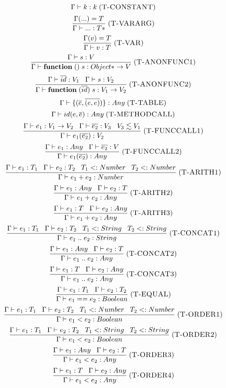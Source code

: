 \documentclass[12pt]{article}
\newcommand{\mylabel}[1]{\; (\textsc{#1})}
\newcommand{\subtype}{<:}
\newcommand{\env}{\Gamma}
\begin{document}
\[
\env \vdash k : k
\mylabel{T-CONSTANT}
\]
\[
\frac{\env({...}) = T}
     {\env \vdash {...} : T*}
\mylabel{T-VARARG}
\]
\[
\frac{\env(v) = T}
     {\env \vdash v : T}
\mylabel{T-VAR}
\]
\[
\frac{\env \vdash s:V}
     {\env \vdash \mathbf{function} \; () \; s : {Object*} \rightarrow V}
\mylabel{T-ANONFUNC1}
\]
\[
\frac{\env \vdash \overline{id}:V_{1} \;\;\; \env \vdash s:V_{2}}
     {\env \vdash \mathbf{function} \; (\overline{id}) \; s :
     {V_{1}} \rightarrow V_{2}}
\mylabel{T-ANONFUNC2}
\]
\[
\env \vdash \{(\overline{e},\overline{(e,e)})\} : Any
\mylabel{T-TABLE}
\]
\[
\env \vdash id(e,\overline{e}) : Any
\mylabel{T-METHODCALL}
\]
\[
\frac{\env \vdash e_{1}:V_{1} \rightarrow V_{2} \;\;\;
      \env \vdash \overline{e_{2}}:V_{3} \;\;\; V_{3} \lesssim V_{1}}
     {\env \vdash e_{1}(\overline{e_{2}}) : V_{2}}
\mylabel{T-FUNCCALL1}
\]
\[
\frac{\env \vdash e_{1}:Any \;\;\; \env \vdash \overline{e_{2}}:V}
     {\env \vdash e_{1}(\overline{e_{2}}) : Any}
\mylabel{T-FUNCCALL2}
\]
\[
\frac{\env \vdash e_{1}:T_{1} \;\;\; \env \vdash e_{2}:T_{2} \;\;\;
      T_{1} \subtype Number \;\;\; T_{2} \subtype Number}
     {\env \vdash e_{1} + e_{2} : Number}
\mylabel{T-ARITH1}
\]
\[
\frac{\env \vdash e_{1}:Any \;\;\; \env \vdash e_{2}:T}
     {\env \vdash e_{1} + e_{2} : Any}
\mylabel{T-ARITH2}
\]
\[
\frac{\env \vdash e_{1}:T \;\;\; \env \vdash e_{2}:Any}
     {\env \vdash e_{1} + e_{2} : Any}
\mylabel{T-ARITH3}
\]
\[
\frac{\env \vdash e_{1}:T_{1} \;\;\; \env \vdash e_{2}:T_{2} \;\;\;
      T_{1} \subtype String \;\;\; T_{2} \subtype String}
     {\env \vdash e_{1} \; {..} \;  e_{2} : String}
\mylabel{T-CONCAT1}
\]
\[
\frac{\env \vdash e_{1}:Any \;\;\; \env \vdash e_{2}:T}
     {\env \vdash e_{1} \; {..} \; e_{2} : Any}
\mylabel{T-CONCAT2}
\]
\[
\frac{\env \vdash e_{1}:T \;\;\; \env \vdash e_{2}:Any}
     {\env \vdash e_{1} \; {..} \; e_{2} : Any}
\mylabel{T-CONCAT3}
\]
\[
\frac{\env \vdash e_{1}:T_{1} \;\;\; \env \vdash e_{2}:T_{2}}
     {\env \vdash e_{1} == e_{2} : Boolean}
\mylabel{T-EQUAL}
\]
\[
\frac{\env \vdash e_{1}:T_{1} \;\;\; \env \vdash e_{2}:T_{2} \;\;\;
      T_{1} \subtype Number \;\;\; T_{2} \subtype Number}
     {\env \vdash e_{1} < e_{2} : Boolean}
\mylabel{T-ORDER1}
\]
\[
\frac{\env \vdash e_{1}:T_{1} \;\;\; \env \vdash e_{2}:T_{2} \;\;\;
      T_{1} \subtype String \;\;\; T_{2} \subtype String}
     {\env \vdash e_{1} < e_{2} : Boolean}
\mylabel{T-ORDER2}
\]
\[
\frac{\env \vdash e_{1}:Any \;\;\; \env \vdash e_{2}:T}
     {\env \vdash e_{1} < e_{2} : Any}
\mylabel{T-ORDER3}
\]
\[
\frac{\env \vdash e_{1}:T \;\;\; \env \vdash e_{2}:Any}
     {\env \vdash e_{1} < e_{2} : Any}
\mylabel{T-ORDER4}
\]
\end{document}
